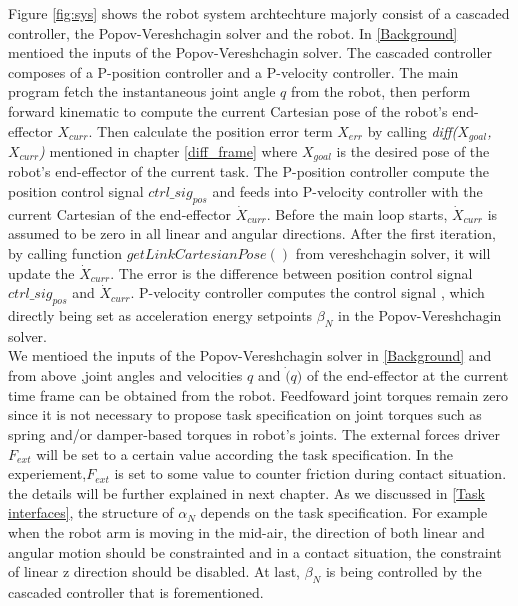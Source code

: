 \documentclass[report.tex]{subfiles}
\begin{document}
    Figure \ref{fig:sys} shows the robot system archtechture majorly consist of a cascaded controller, the Popov-Vereshchagin solver and the robot. In \ref{Background} mentioed the inputs of the Popov-Vereshchagin solver. The cascaded controller composes of a P-position controller and a P-velocity controller. The main program fetch the instantaneous joint angle $q$ from the robot, then perform forward kinematic to compute the current Cartesian pose of the robot's end-effector $X_{curr}$. Then calculate the position error term $X_{err}$ by calling \textit{diff($X_{goal}$,$X_{curr}$)} mentioned in chapter \ref{diff_frame} where $X_{goal}$ is the desired pose of the robot's end-effector of the current task. The P-position controller compute the position control signal $ctrl\_sig_{pos}$ and feeds into P-velocity controller with the current Cartesian of the end-effector $\dot{X}_{curr}$. Before the main loop starts, $\dot{X}_{curr}$ is assumed to be zero in all linear and angular directions. After the first iteration, by calling function $getLinkCartesianPose()$ from vereshchagin solver, it will update the $\dot{X}_{curr}$. The error is the difference between position control signal $ctrl\_sig_{pos}$ and $\dot{X}_{curr}$. P-velocity controller computes the control signal , which directly being set as acceleration energy setpoints $\beta_N$ in the Popov-Vereshchagin solver.\\
    We mentioed the inputs of the Popov-Vereshchagin solver in \ref{Background} and from above ,joint angles and velocities $q$ and $\dot(q)$ of the end-effector at the current time frame can be obtained from the robot. Feedfoward joint torques remain zero since it is not necessary to propose task specification on joint torques such as spring and/or damper-based torques in robot's joints\cite{Vukcevic2020}. The external forces driver $F_{ext}$ will be set to a certain value according the task specification. In the experiement,$F_{ext}$ is set to some value to counter friction during contact situation. the details will be further explained in next chapter.
    As we discussed in \ref{Task interfaces}, the structure of $\alpha_N$ depends on the task specification. For example when the robot arm is moving in the mid-air, the direction of both linear and angular motion should be constrainted and in a contact situation, the constraint of linear z direction should be disabled. At last, $\beta_N$ is being controlled by the cascaded controller that is forementioned.
\end{document}
